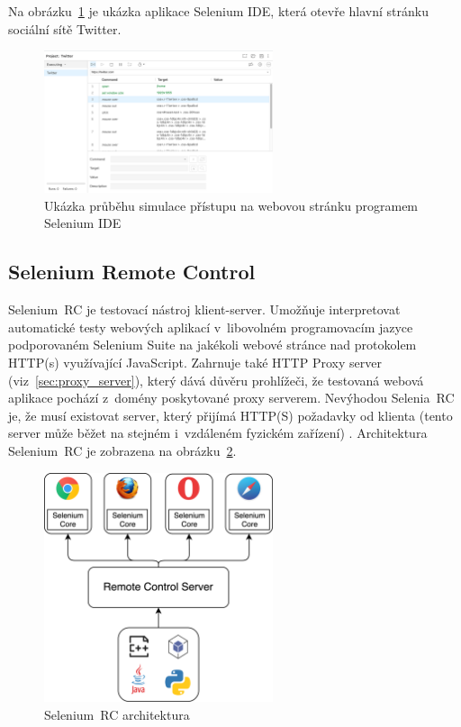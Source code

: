 Na obrázku~\ref{img:selenium_IDE} je ukázka aplikace Selenium IDE, která otevře hlavní stránku sociální sítě Twitter.

\begin{figure}[hbt]
	\centering
	\includegraphics[width=0.6\textwidth]{images/selenium_IDE.png}
	\caption{Ukázka průběhu simulace přístupu na webovou stránku programem Selenium IDE}
	\label{img:selenium_IDE}
\end{figure}

\subsection*{Selenium Remote Control}
Selenium~RC je testovací nástroj klient-server. Umožňuje interpretovat automatické testy webových aplikací v~libovolném programovacím jazyce podporovaném Selenium Suite na jakékoli webové stránce nad protokolem HTTP(s) využívající JavaScript. Zahrnuje také HTTP Proxy server (viz~\ref{sec:proxy_server}), který dává důvěru prohlížeči, že testovaná webová aplikace pochází z~domény poskytované proxy serverem. Nevýhodou Selenia~RC je, že musí existovat server, který přijímá HTTP(S) požadavky od klienta (tento server může běžet na stejném i~vzdáleném fyzickém zařízení) \cite{bib:selenium_tool_suite, bib:selenium_grid}. Architektura Selenium~RC je zobrazena na obrázku~\ref{img:selenium_remote_control}.

\begin{figure}[hbt]
	\centering
	\includegraphics[width=0.6\textwidth]{images/selenium_remote_control.png}
	\caption{Selenium~RC architektura}
	\label{img:selenium_remote_control}
\end{figure}

